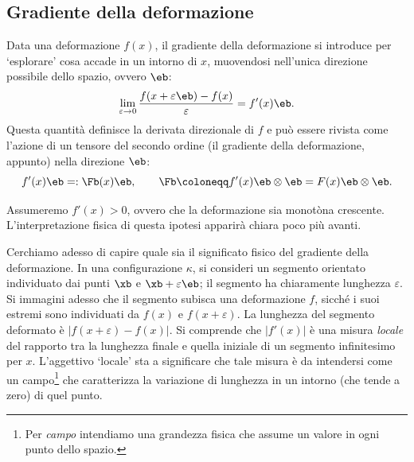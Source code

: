 \subsection{Gradiente della deformazione}
Data una deformazione $f(x)$, il gradiente della deformazione si introduce per `esplorare' cosa accade in un intorno di $x$, muovendosi nell'unica direzione possibile dello spazio, ovvero $\eb$:
\begin{equation}\label{F1}
\lim_{\varepsilon\to 0}\frac{f(x+\varepsilon\eb)- f (x)}{\varepsilon}=f'(x)\eb.
\end{equation}
Questa quantità definisce la derivata direzionale di $f$ e può essere rivista come l'azione di un tensore del secondo ordine (il gradiente della deformazione, appunto) nella direzione $\eb$:
\begin{equation}
f'(x)\eb=:\Fb(x)\eb, \qquad \Fb\coloneqq f'(x)\eb\otimes \eb=F(x)\eb\otimes \eb.
\end{equation}

Assumeremo $f'(x)>0$, ovvero che la deformazione sia monot\`{o}na crescente. L'interpretazione fisica di questa ipotesi apparirà chiara poco più avanti.

Cerchiamo adesso di capire quale sia il significato fisico del gradiente della deformazione.  In una configurazione $\kappa$, si consideri un segmento orientato individuato dai punti $\xb$ e $\xb+\varepsilon \eb$; il segmento ha chiaramente lunghezza $\varepsilon$. Si immagini adesso che il segmento subisca una deformazione $f$, sicché i suoi estremi sono individuati da $f(x)$ e $f(x+\varepsilon)$. La lunghezza del segmento deformato è $|f(x+\varepsilon)-f(x)|$.
Si comprende che $|f'(x)|$ è una misura \textit{locale} del rapporto tra la lunghezza finale e quella iniziale di un segmento infinitesimo per $x$. L'aggettivo `locale' sta a significare che tale misura è da intendersi come un campo\footnote{Per  \textit{campo} intendiamo una grandezza fisica che assume un valore in ogni punto dello spazio.} che caratterizza la variazione di lunghezza in un intorno (che tende a zero) di quel punto.

